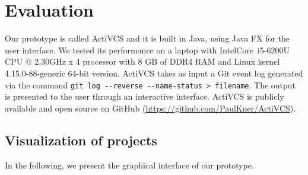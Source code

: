 \section{Evaluation}
\label{sec:results}

Our prototype is called ActiVCS and it is built in Java, using Java FX for the user interface. We tested its performance on a laptop with Intel\textregistered Core\texttrademark~i5-6200U CPU @ 2.30GHz x 4 processor with 8 GB of DDR4 RAM and Linux kernel 4.15.0-88-generic 64-bit version. ActiVCS takes as input a Git event log generated via the command 
\lstinline{git log --reverse --name-status > filename}. The output is presented to the user through an interactive interface. ActiVCS is publicly available and open source on GitHub (\url{https://github.com/PaulKner/ActiVCS}).

\subsection{Visualization of projects}

In the following, we present the graphical interface of our prototype. 

